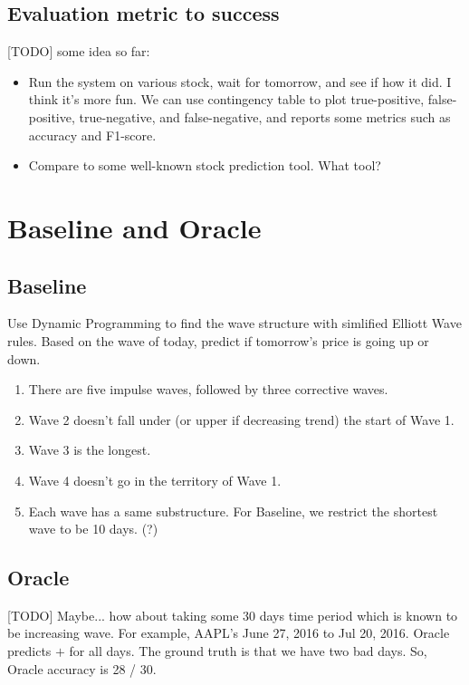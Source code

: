 \documentclass[12pt]{article}
\begin{document}
\subsection*{Evaluation metric to success}

[TODO] some idea so far:

\begin{itemize}
\item Run the system on various stock, wait for tomorrow, and see if
  how it did. I think it's more fun. We can use contingency table to plot true-positive, false-positive, true-negative, and false-negative, and reports some metrics such as accuracy and F1-score.
\item Compare to some well-known stock prediction tool. What tool? 
\end{itemize}
      
\section*{Baseline and Oracle}

\subsection*{Baseline}

Use Dynamic Programming to find the wave structure with simlified
Elliott Wave rules. Based on the wave of today, predict if tomorrow's
price is going up or down.

\begin{enumerate}
 \item There are five impulse waves, followed by three corrective waves.
 \item Wave 2 doesn’t fall under (or upper if decreasing trend) the start of Wave 1.
 \item Wave 3 is the longest.
 \item Wave 4 doesn’t go in the territory of Wave 1.
 \item Each wave has a same substructure. For Baseline, we restrict the shortest wave to be 10 days. (?)
\end{enumerate}

\subsection*{Oracle}

[TODO] Maybe... how about taking some 30 days time period which is
known to be increasing wave. For example, AAPL's June 27, 2016 to Jul
20, 2016. Oracle predicts $+$ for all days. The ground truth is that
we have two bad days. So, Oracle accuracy is 28 / 30.
\end{document}

